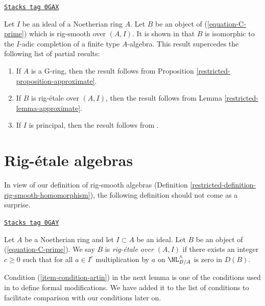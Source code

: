 \begin{remark}[Discussion]
\label{restricted-remark-discussion}
\href{https://stacks.math.columbia.edu/tag/0GAX}{\texttt{Stacks tag 0GAX}}

Let $I$ be an ideal of a Noetherian ring $A$. Let $B$ be an object
of (\ref{equation-C-prime}) which is rig-smooth over $(A, I)$.
It is shown in \cite[Theorem 1.2]{gabber-zavyalov} that $B$ is
isomorphic to the $I$-adic completion of a finite type $A$-algebra.
This result supercedes the following list of partial results:
\begin{enumerate}
\item If $A$ is a G-ring, then the result follows from
Proposition \ref{restricted-proposition-approximate}.
\item If $B$ is rig-\'etale over $(A, I)$, then the result follows from
Lemma \ref{restricted-lemma-approximate}.
\item If $I$ is principal, then the result follows from
\cite[III Theorem 7]{Elkik}.
\end{enumerate}
\end{remark}

\section{Rig-\'etale algebras}
\label{restricted-section-rig-etale}
In view of our definition of rig-smooth algebras
(Definition \ref{restricted-definition-rig-smooth-homomorphism}),
the following definition should not come as a surprise.

\begin{definition}
\label{restricted-definition-rig-etale-homomorphism}
\href{https://stacks.math.columbia.edu/tag/0GAY}{\texttt{Stacks tag 0GAY}}

Let $A$ be a Noetherian ring and let $I \subset A$ be an ideal.
Let $B$ be an object of (\ref{equation-C-prime}). We say
$B$ is {\it rig-\'etale over $(A, I)$} if there exists an integer
$c \geq 0$ such that for all $a \in I^c$
multiplication by $a$ on $\NL_{B/A}^\wedge$
is zero in $D(B)$.
\end{definition}

Condition (\ref{item-condition-artin}) in the next lemma is
one of the conditions used in \cite{ArtinII} to define formal modifications.
We have added it to the list of conditions to facilitate comparison
with our conditions later on.

